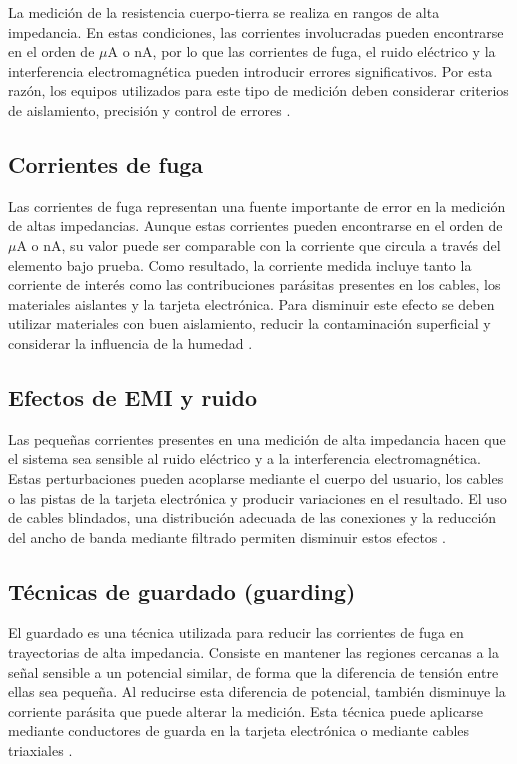 La medición de la resistencia cuerpo-tierra se realiza en rangos de alta impedancia. En
estas condiciones, las corrientes involucradas pueden encontrarse en el orden de $\mu$A
o nA, por lo que las corrientes de fuga, el ruido eléctrico y la interferencia
electromagnética pueden introducir errores significativos. Por esta razón, los equipos
utilizados para este tipo de medición deben considerar criterios de aislamiento, precisión
y control de errores \cite{keithley_lowlevel}.

\subsection{Corrientes de fuga}

Las corrientes de fuga representan una fuente importante de error en la medición de altas
impedancias. Aunque estas corrientes pueden encontrarse en el orden de $\mu$A o nA, su
valor puede ser comparable con la corriente que circula a través del elemento bajo prueba.
Como resultado, la corriente medida incluye tanto la corriente de interés como las
contribuciones parásitas presentes en los cables, los materiales aislantes y la tarjeta
electrónica. Para disminuir este efecto se deben utilizar materiales con buen aislamiento,
reducir la contaminación superficial y considerar la influencia de la humedad
\cite{keithley_lowlevel}.

\subsection{Efectos de EMI y ruido}

Las pequeñas corrientes presentes en una medición de alta impedancia hacen que el sistema
sea sensible al ruido eléctrico y a la interferencia electromagnética. Estas perturbaciones
pueden acoplarse mediante el cuerpo del usuario, los cables o las pistas de la tarjeta
electrónica y producir variaciones en el resultado. El uso de cables blindados, una
distribución adecuada de las conexiones y la reducción del ancho de banda mediante
filtrado permiten disminuir estos efectos \cite{keithley_lowlevel}.

\subsection{Técnicas de guardado (guarding)}

El guardado es una técnica utilizada para reducir las corrientes de fuga en trayectorias de
alta impedancia. Consiste en mantener las regiones cercanas a la señal sensible a un
potencial similar, de forma que la diferencia de tensión entre ellas sea pequeña. Al
reducirse esta diferencia de potencial, también disminuye la corriente parásita que puede
alterar la medición. Esta técnica puede aplicarse mediante conductores de guarda en la
tarjeta electrónica o mediante cables triaxiales \cite{keithley_lowlevel}.

